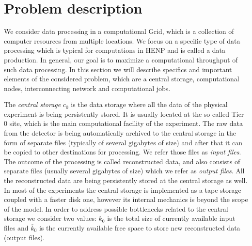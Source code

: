 \documentclass{svjour3}                     %
\begin{document}
\section{Problem description}
\label{problem}
We consider data processing in a computational Grid, which is a collection of computer resources from multiple locations.  We focus on a specific type of data processing which is typical for computations in HENP and is called a data production. In general, our goal is to maximize a computational throughput of such data processing. In this section we will describe specifics and important elements of the considered problem, which are a central storage, computational nodes, interconnecting network and computational jobs.

The \textit{central storage} $c_0$ is the data storage where all the data of the physical experiment is being persistently stored. It is usually located at the so called Tier-0 site, which is the main computational facility of the experiment.  The raw data from the detector is being automatically archived to the central storage in the form of separate files (typically of several gigabytes of size) and after that it can be copied to other destinations for processing. We refer those files as \textit{input files}. The outcome of the processing is called reconstructed data, and also consists of separate files (usually several gigabytes of size) which we refer as \textit{output files}. All the reconstructed data are being persistently stored at the central storage as well. In most of the experiments the central storage is implemented as a tape storage coupled with a faster disk one, however its internal mechanics is beyond the scope of the model. In order to address possible bottlenecks related to the central storage we consider two values: $k_{0}$ is the total size of currently available input files and $\overline{k}_{0}$ is the currently available free space to store new reconstructed data (output files).
\end{document}
